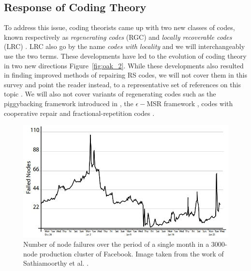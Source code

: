 \begin{multicols}{2}
	\subsection{Response of Coding Theory} \label{sec:response} 
	
	To address this issue, coding theorists came up with two new classes of codes, known respectively as {\em regenerating codes} (RGC) \cite{DimGodWuWaiRam} and {\em locally recoverable codes} (LRC) \cite{GopHuaSimYek}. LRC also go by the name {\em codes with locality} and we will interchangeably use the two terms.  These developments have led to the evolution of coding theory in two new directions Figure~\ref{fig:oak_2}.  While these developments also resulted in finding improved methods of repairing RS codes, we will not cover them in this survey and point the reader instead, to a representative set of  references on this topic \cite{ShaPapDimCai,GuruWoot,DauDuuKiaMil}. We will also not cover variants of regenerating codes such as the piggybacking framework introduced in \cite{RasShaRam_piggy}, the $\epsilon-$MSR framework \cite{RawTamGurEfr}, codes with cooperative repair \cite{HuXuWanZhaLi} and fractional-repetition codes \cite{ElRam}.
\end{multicols}


			\begin{figure}[!h]
				\centering
				\includegraphics[scale=.45]{src/Figures/chap4/FB_failures2}  
				\caption{Number of node failures over the period of a single month in a $3000$-node production cluster of Facebook. Image taken from the work of Sathiamoorthy et al. \cite{SathiaAstPap_Xorbas}.}  \label{fig:FB_failures}    
			\end{figure}      

\newpage

